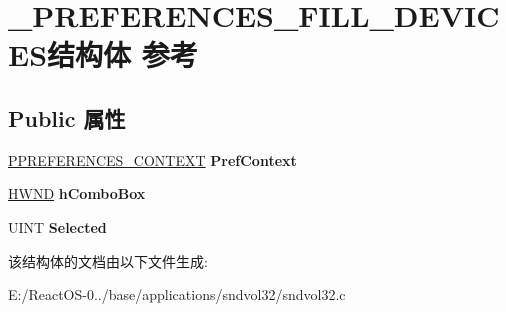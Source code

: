 \hypertarget{struct___p_r_e_f_e_r_e_n_c_e_s___f_i_l_l___d_e_v_i_c_e_s}{}\section{\+\_\+\+P\+R\+E\+F\+E\+R\+E\+N\+C\+E\+S\+\_\+\+F\+I\+L\+L\+\_\+\+D\+E\+V\+I\+C\+E\+S结构体 参考}
\label{struct___p_r_e_f_e_r_e_n_c_e_s___f_i_l_l___d_e_v_i_c_e_s}
\subsection*{Public 属性}
\begin{DoxyCompactItemize}
\item 
\mbox{\label{struct___p_r_e_f_e_r_e_n_c_e_s___f_i_l_l___d_e_v_i_c_e_s_ae2a71815c5b9bdcf6a6cc951cbee0cb0}} 
\hyperlink{struct___p_r_e_f_e_r_e_n_c_e_s___c_o_n_t_e_x_t}{P\+P\+R\+E\+F\+E\+R\+E\+N\+C\+E\+S\+\_\+\+C\+O\+N\+T\+E\+XT} {\bfseries Pref\+Context}
\item 
\mbox{\label{struct___p_r_e_f_e_r_e_n_c_e_s___f_i_l_l___d_e_v_i_c_e_s_a60bdf1d6cdadc587435ac35ffd6f61a6}} 
\hyperlink{interfacevoid}{H\+W\+ND} {\bfseries h\+Combo\+Box}
\item 
\mbox{\label{struct___p_r_e_f_e_r_e_n_c_e_s___f_i_l_l___d_e_v_i_c_e_s_af166ac7a10b20ed9a5086e96d588ce17}} 
U\+I\+NT {\bfseries Selected}
\end{DoxyCompactItemize}


该结构体的文档由以下文件生成\+:\begin{DoxyCompactItemize}
\item 
E\+:/\+React\+O\+S-\/0../base/applications/sndvol32/sndvol32.\+c\end{DoxyCompactItemize}
